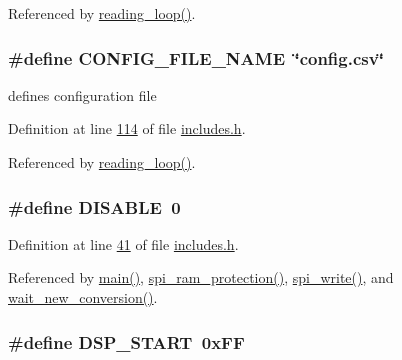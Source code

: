 Referenced by \hyperlink{a00035_source_l00302}{reading\-\_\-loop()}.

\hypertarget{a00037_a62921b92fa4fb37f1e3a5d4c644fc1d8}{
\subsubsection[{C\-O\-N\-F\-I\-G\-\_\-\-F\-I\-L\-E\-\_\-\-N\-A\-M\-E}]{\setlength{\rightskip}{0pt plus 5cm}\#define C\-O\-N\-F\-I\-G\-\_\-\-F\-I\-L\-E\-\_\-\-N\-A\-M\-E~\char`\"{}config.\-csv\char`\"{}}}\label{d1/dc6/a00037_a62921b92fa4fb37f1e3a5d4c644fc1d8}


defines configuration file 



Definition at line \hyperlink{a00037_source_l00114}{114} of file \hyperlink{a00037_source}{includes.\-h}.



Referenced by \hyperlink{a00035_source_l00302}{reading\-\_\-loop()}.

\hypertarget{a00037_a99496f7308834e8b220f7894efa0b6ab}{
\subsubsection[{D\-I\-S\-A\-B\-L\-E}]{\setlength{\rightskip}{0pt plus 5cm}\#define D\-I\-S\-A\-B\-L\-E~0}}\label{d1/dc6/a00037_a99496f7308834e8b220f7894efa0b6ab}


Definition at line \hyperlink{a00037_source_l00041}{41} of file \hyperlink{a00037_source}{includes.\-h}.



Referenced by \hyperlink{a00035_source_l00198}{main()}, \hyperlink{a00040_source_l00343}{spi\-\_\-ram\-\_\-protection()}, \hyperlink{a00040_source_l00221}{spi\-\_\-write()}, and \hyperlink{a00035_source_l00122}{wait\-\_\-new\-\_\-conversion()}.

\hypertarget{a00037_ae7c7d554ff023db5a11623df910b93af}{
\subsubsection[{D\-S\-P\-\_\-\-S\-T\-A\-R\-T}]{\setlength{\rightskip}{0pt plus 5cm}\#define D\-S\-P\-\_\-\-S\-T\-A\-R\-T~0x\-F\-F}}\label{d1/dc6/a00037_ae7c7d554ff023db5a11623df910b93af}


